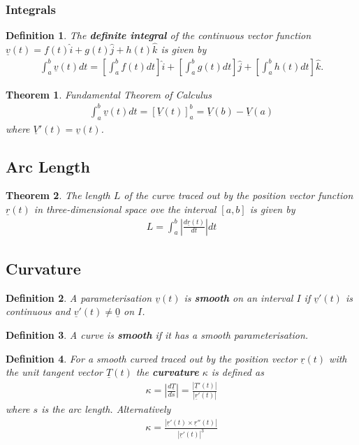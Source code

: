 \documentclass{article}
\theoremstyle{sltheorem}
\newtheorem{definition}{Definition}[section]
\newtheorem{theorem}{Theorem}[section]
\newcommand{\ih}{\widehat i}
\newcommand{\jh}{\widehat j}
\newcommand{\kh}{\widehat k}
\renewcommand{\vec}{\underline}
\newcommand{\dv}[1]{\vec #1'}
\newcommand*\B[1]{\textbf{#1}}
\begin{document}
\subsubsection{Integrals}
\begin{definition}
    The \B{definite integral} of the continuous vector function $\vec v(t)=f(t)\ih + g(t)\jh + h(t)\kh$ is given by
    \begin{align*}
        \int_a^b \vec v(t)dt = \left[\int_a^b f(t)dt\right]\ih + \left[\int_a^b g(t) dt\right]\jh + \left[\int_a^b h(t)dt\right] \kh.
    \end{align*}
\end{definition}
\begin{theorem}{Fundamental Theorem of Calculus}
    \begin{align*}
        \int_a^b \vec v(t) dt = \left[\vec V(t)\right]^b_a = \vec V(b) - \vec V(a)
    \end{align*} 
    where $\vec V'(t) = \vec v(t)$.
\end{theorem}
\subsection{Arc Length}
\begin{theorem}
    The length $L$ of the curve traced out by the position vector function $\vec r(t)$ in three-dimensional space ove the interval
    $[a,b]$ is given by
    \begin{align*}
        L = \int_a^b \left|\frac{d\vec r(t)}{dt}\right| dt
    \end{align*}
\end{theorem}
\subsection{Curvature}
\begin{definition}
    A parameterisation $\vec v(t)$ is \B{smooth} on an interval $I$ if $\vec v'(t)$ is continuous and $\vec v'(t) \not = \vec 0$ on $I$.
\end{definition}
\begin{definition}
    A curve is \B{smooth} if it has a smooth parameterisation.
\end{definition}
\begin{definition}
    For a smooth curved traced out by the position vector $\vec r(t)$ with the unit tangent vector 
    $\vec T(t)$ the \B{curvature} $\kappa$ is defined as
    \begin{align*}
        \kappa = \left|\frac{d\vec T}{ds}\right|=\frac{\left| \vec T'(t)\right|}{\left|\vec r'(t)\right|}
    \end{align*}
    where $s$ is the arc length.
    Alternatively
    \begin{align*}
        \kappa = \frac{\left|\dv r(t) \times \dv r'(t)\right|}{|\dv r(t)|^3}
    \end{align*}
\end{definition}
\end{document}
